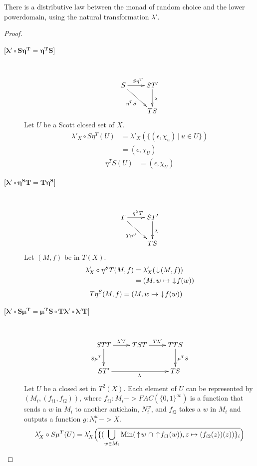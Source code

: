 \begin{proposition}
There is a distributive law between the monad of random choice and the lower powerdomain, using the natural transformation $\lambda'$.
\end{proposition}
\begin{proof}
\begin{description}
\item[{[}$\boldsymbol{\lambda'\circ S\eta^T = \eta^T S}${]}] \hfill \\
\[
\xymatrix{
S\ar[r]^{S\eta^T}\ar[dr]_{\eta^T S} & ST\ar[d]^\lambda' \\
& TS
}
\]
Let $U$ be a Scott closed set of $X$.
\begin{align*}
\lambda'_X \circ S\eta^T (U) &= \lambda'_X (\{(\epsilon, \chi_u)\ |\ u\in U\}) \\
&= (\epsilon, \chi_U)
\end{align*}
\begin{align*}
\eta^T S(U) &= (\epsilon, \chi_U)
\end{align*}
\item[{[}$\boldsymbol{\lambda'\circ \eta^S T = T\eta^S}${]}] \hfill \\
\[
\xymatrix{
T\ar[r]^{\eta^S T}\ar[dr]_{T\eta^S} & ST\ar[d]^\lambda' \\
& TS
}
\]
Let $(M,f)$ be in $T(X)$.
\begin{align*}
\lambda'_X \circ \eta^S T (M,f) &= \lambda'_X (\,\downarrow\! (M,f)) \\
&= (M, w\mapsto\,\,\downarrow\! f(w))
\end{align*}
\begin{align*}
T\eta^S (M,f) &= (M,w\mapsto\,\,\downarrow\! f(w))
\end{align*}
\item[{[}$\boldsymbol{\lambda'\circ S\mu^T = \mu^T S\circ T\lambda'\circ\lambda' T}${]}] \hfill \\
\[
\xymatrix{
STT\ar[r]^{\lambda' T}\ar[d]_{S\mu^T} & TST\ar[r]^{T\lambda'} & TTS\ar[d]^{\mu^T S} \\
ST\ar[rr]_\lambda' & & TS
}
\]
Let $U$ be a closed set in $T^2(X)$.  Each element of $U$ can be represented by $(M_i, (f_{i1}, f_{i2}))$, where $f_{i1}:M_i->FAC(\{0,1\}^\infty)$ is a function that sends a $w$ in $M_i$ to another antichain, $N_i^w$, and $f_{i2}$ takes a $w$ in $M_i$ and outputs a function $g:N_i^w->X$.
\begin{align*}
\lambda'_X\circ S\mu^T (U) &= \lambda'_X \Bigl(\overline{\{(\bigcup_{w\in M_i} \Min(\ua w\ \cap \ua f_{i1}(w)), z\mapsto (f_{i2}(z))(z))\}_i}\Bigr) \\

\end{align*}
\end{description}
\end{proof}
